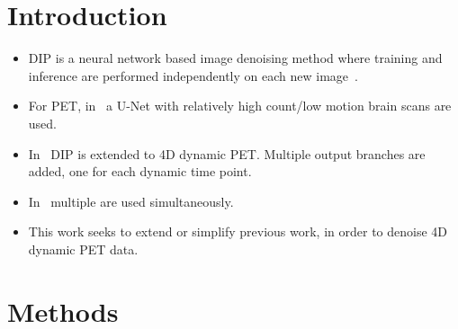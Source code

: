 \documentclass[portrait, color=UCLburgundy, margin=1cm]{uclposter}
\begin{document}
    \begin{multicols}{2}
        \section*{Introduction}
            \begin{highlightbox}[UCLlightgreen]
                \begin{itemize}
                    \item \gls{DIP} is a neural network based image denoising method where training and inference are performed independently on each new image~\cite{Ulyanov2018DeepPrior}.
                    \item For \acrshort{PET}, in~\cite{Gong2019PETPrior} a U-Net with relatively high count/low motion brain scans are used.
                    \item In~\cite{Hashimoto20214DNetwork} \gls{DIP} is extended to \acrshort{4D} dynamic \acrshort{PET}. Multiple output branches are added, one for each dynamic time point.
                    \item In~\cite{Yang2022SimultaneousPrior} multiple  are used simultaneously.
                    \item This work seeks to extend or simplify previous work, in order to denoise \acrshort{4D} dynamic \acrshort{PET} data.
                \end{itemize}
            \end{highlightbox}
        
        \section*{Methods}

\end{multicols}
\end{document}
